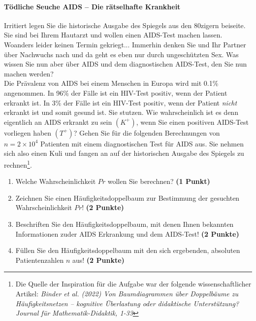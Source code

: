 \documentclass[a4paper, 10pt]{scrartcl}\usepackage[]{graphicx}\usepackage[]{xcolor}
\begin{document}
\paragraph{T{\"o}dliche Seuche AIDS -- Die r{\"a}tselhafte Krankheit}




Irritiert legen Sie die historische Ausgabe des Spiegels aus den 80zigern
beiseite. Sie sind bei Ihrem Hautarzt und wollen einen AIDS-Test machen
lassen. Woanders leider keinen Termin gekriegt... Immerhin denken Sie und
Ihr Partner {\"u}ber Nachwuchs nach und da geht es eben nur durch
ungesch{\"u}tzten Sex. Was wissen Sie nun aber {\"u}ber AIDS und dem diagnostischen
AIDS-Test, den Sie nun machen werden?\\

Die Pr{\"a}valenz von AIDS bei einem Menschen in Europa wird mit
0.1\% angenommen. In 96\% der F{\"a}lle ist ein
HIV-Test positiv, wenn der Patient erkrankt ist. In 3\%
der F{\"a}lle ist ein HIV-Test positiv, wenn der Patient \textit{nicht}
erkrankt ist und somit gesund ist. Sie stutzen. Wie wahrscheinlich ist es
denn eigentlich an AIDS erkrankt zu sein $(K^+)$, wenn Sie einen positiven
AIDS-Test vorliegen haben $(T^+)$? Gehen Sie f{\"u}r die folgenden Berechnungen
von $n = \ensuremath{2\times 10^{4}}$ Patienten mit einem diagnostischen Test f{\"u}r AIDS
aus. Sie nehmen sich also einen Kuli und fangen an auf der historischen
Ausgabe des Spiegels zu rechnen\footnote{Die Quelle der Inspiration f{\"u}r die
  Aufgabe war der folgende wissenschaftlicher Artikel: \textit{Binder et
    al. (2022) Von Baumdiagrammen {\"u}ber Doppelb{\"a}ume zu H{\"a}ufigkeitsnetzen --
    kognitive {\"U}berlastung oder didaktische Unterst{\"u}tzung? Journal f{\"u}r
    Mathematik-Didaktik, 1-33}}.

\begin{enumerate}
\item Welche Wahrscheinlichkeit $Pr$ wollen Sie berechnen? \textbf{(1 Punkt)}
\item Zeichnen Sie einen H{\"a}ufigkeitsdoppelbaum zur Bestimmung der gesuchten
  Wahrscheinlichkeit $Pr$! \textbf{(2 Punkte)} 
\item Beschriften Sie den H{\"a}ufigkeitsdoppelbaum, mit denen Ihnen bekannten
  Informationen zuder AIDS Erkrankung und dem AIDS-Test! \textbf{(2 Punkte)}
\item F{\"u}llen Sie den H{\"a}ufigkeitsdoppelbaum mit den sich ergebenden,
  absoluten Patientenzahlen $n$ aus! \textbf{(2 Punkte)}
\end{enumerate}
\end{document}
